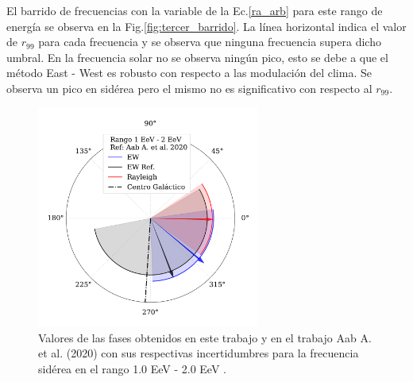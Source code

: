     El barrido de frecuencias con la variable de la Ec.\ref{ra_arb} para este rango de energía se observa en la Fig.\ref{fig:tercer_barrido}. La línea horizontal indica el valor de $r_{99}$ para cada frecuencia y se observa que ninguna frecuencia supera dicho umbral. En la frecuencia solar no se observa ningún pico, esto se debe a que el método East - West es robusto con respecto a las modulación del clima. Se observa un pico en sidérea pero el mismo no es significativo con respecto al $r_{99}$.


    \begin{figure}[H]
        \begin{small}
            \begin{center}
                \vspace*{-0.65 cm}
                \includegraphics[width=0.65\textwidth]{phase_tercer_bin_v3.pdf}
                \vspace*{-1.2 cm}
            \end{center}
        \caption{Valores de las fases obtenidos en este trabajo y en el trabajo Aab A. et al. (2020) \cite{Aab_2020} con sus respectivas incertidumbres para la frecuencia sidérea en el  rango 1.0 EeV - 2.0 EeV .}
        \label{fig:tercer}
        \end{small}
    \end{figure}

